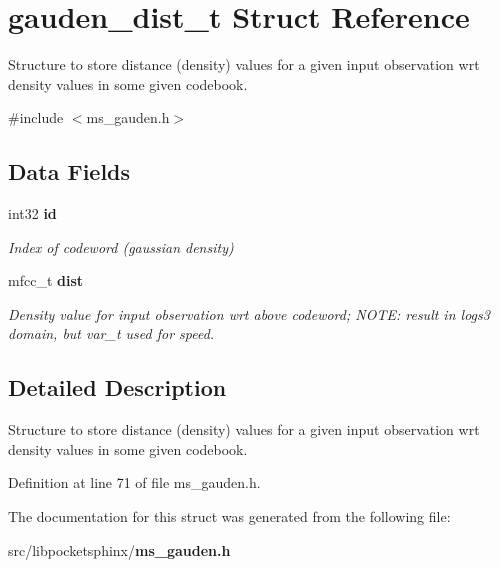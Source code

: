 \section{gauden\-\_\-dist\-\_\-t Struct Reference}
\label{structgauden__dist__t}


Structure to store distance (density) values for a given input observation wrt density values in some given codebook.  




{\ttfamily \#include $<$ms\-\_\-gauden.\-h$>$}

\subsection*{Data Fields}
\begin{DoxyCompactItemize}
\item 
int32 {\bf id}\label{structgauden__dist__t_a93e978149bae5b5bf089769458c42ee4}

\begin{DoxyCompactList}\small\item\em Index of codeword (gaussian density) \end{DoxyCompactList}\item 
mfcc\-\_\-t {\bf dist}\label{structgauden__dist__t_ab08100d4953998dad76bfcf30864c0c5}

\begin{DoxyCompactList}\small\item\em Density value for input observation wrt above codeword; N\-O\-T\-E\-: result in logs3 domain, but var\-\_\-t used for speed. \end{DoxyCompactList}\end{DoxyCompactItemize}


\subsection{Detailed Description}
Structure to store distance (density) values for a given input observation wrt density values in some given codebook. 

Definition at line 71 of file ms\-\_\-gauden.\-h.



The documentation for this struct was generated from the following file\-:\begin{DoxyCompactItemize}
\item 
src/libpocketsphinx/{\bf ms\-\_\-gauden.\-h}\end{DoxyCompactItemize}
